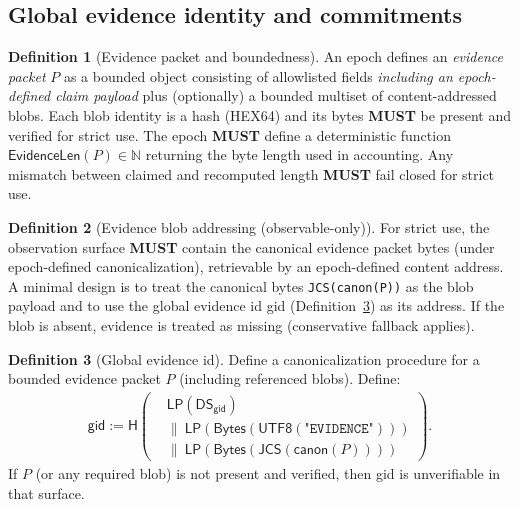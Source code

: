 \documentclass[11pt]{article}
\newcommand{\MUST}{\textbf{MUST}}
\newcommand{\code}[1]{\texttt{#1}}
\newcommand{\term}[1]{\emph{#1}}
\newcommand{\N}{\mathbb{N}}
\newcommand{\1}{\mathbf{1}}
\newcommand{\Hash}{\mathsf{H}}
\newcommand{\DS}{\mathsf{DS}}
\newcommand{\LP}{\mathsf{LP}}
\theoremstyle{definition}
\newtheorem{definition}{Definition}
\theoremstyle{plain}
\begin{document}
\subsection{Global evidence identity and commitments}

\begin{definition}[Evidence packet and boundedness]
\label{def:evidence_packet}
An epoch defines an \term{evidence packet} $P$ as a bounded object consisting of allowlisted fields \emph{including an epoch-defined claim payload} plus (optionally) a bounded multiset of content-addressed blobs. Each blob identity is a hash (HEX64) and its bytes \MUST{} be present and verified for strict use. The epoch \MUST{} define a deterministic function $\mathsf{EvidenceLen}(P)\in\N$ returning the byte length used in accounting. Any mismatch between claimed and recomputed length \MUST{} fail closed for strict use.
\end{definition}

\begin{definition}[Evidence blob addressing (observable-only)]
\label{def:evidence_blob}
For strict use, the observation surface \MUST{} contain the canonical evidence packet bytes (under epoch-defined canonicalization), retrievable by an epoch-defined content address. A minimal design is to treat the canonical bytes \code{JCS(canon(P))} as the blob payload and to use the global evidence id \textsf{gid} (Definition~\ref{def:gid}) as its address. If the blob is absent, evidence is treated as missing (conservative fallback applies).
\end{definition}

\begin{definition}[Global evidence id]
\label{def:gid}
Define a canonicalization procedure for a bounded evidence packet $P$ (including referenced blobs). Define:
\begin{align*}
\textsf{gid}:=\Hash\!\left(\begin{aligned}
&\LP(\DS_{\textsf{gid}})\\
&\|\ \LP(\mathsf{Bytes}(\textsf{UTF8}(\texttt{"EVIDENCE"})))\\
&\|\ \LP(\mathsf{Bytes}(\textsf{JCS}(\textsf{canon}(P))))
\end{aligned}\right).
\end{align*}
If $P$ (or any required blob) is not present and verified, then \textsf{gid} is unverifiable in that surface.
\end{definition}
\end{document}
